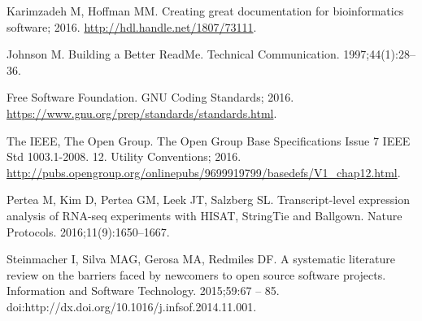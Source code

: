 \documentclass[10pt,letterpaper]{article}
\begin{document}
\begin{thebibliography}{10}
Karimzadeh M, Hoffman MM. Creating great documentation for bioinformatics
  software; 2016.
\newblock \url{http://hdl.handle.net/1807/73111}.

Johnson M.
\newblock Building a Better ReadMe.
\newblock Technical Communication. 1997;44(1):28--36.

{\relax Free Software Foundation}. GNU Coding Standards; 2016.
\newblock \url{https://www.gnu.org/prep/standards/standards.html}.

{\relax The IEEE}, {\relax The Open Group}. The Open Group Base Specifications
  Issue 7 IEEE Std 1003.1-2008. 12. Utility Conventions; 2016.
\newblock
  \url{http://pubs.opengroup.org/onlinepubs/9699919799/basedefs/V1_chap12.html}.

Pertea M, Kim D, Pertea GM, Leek JT, Salzberg SL.
\newblock Transcript-level expression analysis of RNA-seq experiments with
  HISAT, StringTie and Ballgown.
\newblock Nature Protocols. 2016;11(9):1650--1667.

Steinmacher I, Silva MAG, Gerosa MA, Redmiles DF.
\newblock A systematic literature review on the barriers faced by newcomers to
  open source software projects.
\newblock Information and Software Technology. 2015;59:67 -- 85.
\newblock doi:{http://dx.doi.org/10.1016/j.infsof.2014.11.001}.

\end{thebibliography}
\end{document}
